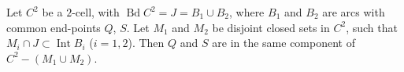 Let $C^2$ be a $2$-cell, with $\operatorname{Bd} C^2 = J = B_1 \cup B_2$, where $B_1$ and $B_2$ are arcs with common end-points $Q$, $S$. Let $M_1$ and $M_2$ be disjoint closed sets in $C^2$, such that $M_i \cap J \subset \operatorname{Int} B_i$ ($i = 1, 2$). Then $Q$ and $S$ are in the same component of $C^2 - (M_1 \cup M_2)$.
